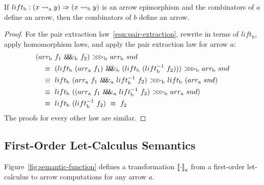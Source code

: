 \documentclass[preprint]{sigplanconf}
\newcommand{\arrow}{\rightsquigarrow}
\newcommand{\arrowlift}{\ensuremath{lift}}
\newcommand{\arrowarr}{\ensuremath{arr}}
\newcommand{\arrowcomp}{\ensuremath{{>}\mspace{-6mu}{>}\mspace{-6mu}{>}}}
\newcommand{\arrowpair}{\ensuremath{\mathit{\&\mspace{-7.5mu}\&\mspace{-7.5mu}\&}}}
\newcommand{\gen}{_\mathrm{a}}
\newcommand{\genb}{_\mathrm{b}}
\begin{document}
\begin{theorem}
If $\arrowlift\genb : (x \arrow\gen y) \tto (x \arrow\genb y)$ is an arrow epimorphism and the combinators of $a$ define an arrow, then the combinators of $b$ define an arrow.
\label{thm:arrow-epimorphism}
\end{theorem}
\begin{proof}
For the pair extraction law~\eqref{eqn:pair-extraction}, rewrite in terms of $\arrowlift\genb$, apply homomorphism laws, and apply the pair extraction law for arrow $a$:
\begin{align*}
	&(\arrowarr\genb~f_1~\arrowpair\genb~f_2)~\arrowcomp\genb~\arrowarr\genb~snd
\\
	&\tab\equiv\ (\arrowlift\genb~(\arrowarr\gen~f_1)~\arrowpair\genb~(\arrowlift\genb~(\arrowlift\genb^{-1}~f_2)))~\arrowcomp\genb~\arrowarr\genb~snd
\\
	&\tab\equiv\ \arrowlift\genb~(\arrowarr\gen~f_1~\arrowpair\gen~\arrowlift\genb^{-1}~f_2)~\arrowcomp\genb~\arrowlift\genb~(\arrowarr\gen~snd)
\\
	&\tab\equiv\ \arrowlift\genb~((\arrowarr\gen~f_1~\arrowpair\gen~\arrowlift\genb^{-1}~f_2)~\arrowcomp\genb~\arrowarr\gen~snd)
\\
	&\tab\equiv\ \arrowlift\genb~(\arrowlift\genb^{-1}~f_2)
	\ \equiv\ f_2
\end{align*}
The proofs for every other law are similar.
\end{proof}


\subsection{First-Order Let-Calculus Semantics}

Figure~\ref{fig:semantic-function} defines a transformation $\meaningof{\cdot}\gen$ from a first-order let-calculus to arrow computations for any arrow $a$.
\end{document}
